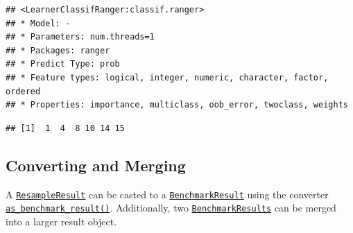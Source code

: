 \documentclass[
]{scrbook}
\newenvironment{Shaded}{\begin{snugshade}}{\end{snugshade}}
\newcommand{\CommentTok}[1]{\textcolor[rgb]{0.56,0.35,0.01}{\textit{#1}}}
\newcommand{\FunctionTok}[1]{\textcolor[rgb]{0.00,0.00,0.00}{#1}}
\newcommand{\NormalTok}[1]{#1}
\newcommand{\OtherTok}[1]{\textcolor[rgb]{0.56,0.35,0.01}{#1}}
\newcommand{\SpecialCharTok}[1]{\textcolor[rgb]{0.00,0.00,0.00}{#1}}
\newcommand{\StringTok}[1]{\textcolor[rgb]{0.31,0.60,0.02}{#1}}
\renewenvironment{Shaded} {\begin{snugshade}\small} {\end{snugshade}}
\begin{document}
\begin{verbatim}
## <LearnerClassifRanger:classif.ranger>
## * Model: -
## * Parameters: num.threads=1
## * Packages: ranger
## * Predict Type: prob
## * Feature types: logical, integer, numeric, character, factor, ordered
## * Properties: importance, multiclass, oob_error, twoclass, weights
\end{verbatim}

\begin{Shaded}
\end{Shaded}

\begin{verbatim}
## [1]  1  4  8 10 14 15
\end{verbatim}

\hypertarget{converting-and-merging}{%
\subsection{Converting and Merging}\label{converting-and-merging}}

A \href{https://mlr3.mlr-org.com/reference/ResampleResult.html}{\texttt{ResampleResult}} can be casted to a \href{https://mlr3.mlr-org.com/reference/BenchmarkResult.html}{\texttt{BenchmarkResult}} using the converter \href{https://mlr3.mlr-org.com/reference/as_benchmark_result.html}{\texttt{as\_benchmark\_result()}}.
Additionally, two \href{https://mlr3.mlr-org.com/reference/BenchmarkResult.html}{\texttt{BenchmarkResults}} can be merged into a larger result object.

\begin{Shaded}
\end{Shaded}
\end{document}
